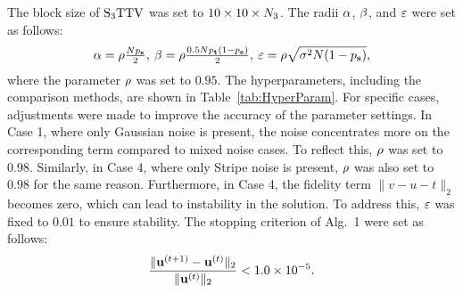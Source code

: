 \begin{itemize}
\end{itemize}



The block size of ${\text{S}_{3} \text{TTV}}$ was set to $10 \times 10 \times N_{3}$.
The radii $\alpha$, $\beta$, and $\varepsilon$ were set as follows:
\begin{equation}
	\label{eq:RadiusSet}
	\alpha = \rho \tfrac{N p_{\mathbf{s}}}{2}, \:
	\beta = \rho \tfrac{0.5 N p_{\mathbf{t}} (1 - p_{\mathbf{s}})}{2}, \: \varepsilon = \rho \sqrt{\sigma^2 N (1 - p_{\mathbf{s}})},
\end{equation}
where the parameter $\rho$ was set to $0.95$.
The hyperparameters, including the comparison methods, are shown in Table~\ref{tab:HyperParam}.
For specific cases, adjustments were made to improve the accuracy of the parameter settings. In Case 1, where only Gaussian noise is present, the noise concentrates more on the corresponding term compared to mixed noise cases. To reflect this, $\rho$ was set to $0.98$. Similarly, in Case 4, where only Stripe noise is present, $\rho$ was also set to $0.98$ for the same reason. Furthermore, in Case 4, the fidelity term $\| v - u - t \|_{2}$ becomes zero, which can lead to instability in the solution. To address this, $\varepsilon$ was fixed to $0.01$ to ensure stability.
The stopping criterion of Alg.~1 were set as follows:
\begin{equation}
	\label{eq:StopCri_simulated}
	\frac{\| \mathbf{u}^{(t+1)} - \mathbf{u}^{(t)} \|_2}{\| \mathbf{u}^{(t)}\|_{2}} < 1.0 \times 10^{-5}.
\end{equation}

